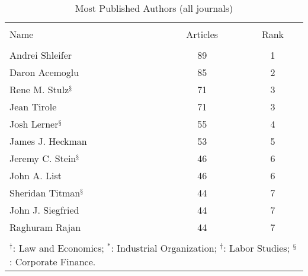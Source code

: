 
\begin{table}[!htbp] \centering 
  \caption{Most Published Authors (all journals)} 
  \label{} 
\begin{adjustbox}{max width = \textwidth}
\begin{tabular}{@{\extracolsep{5pt}} lcc} 
\\[-1.8ex]\hline 
\hline \\[-1.8ex] 
Name & Articles & Rank \\ 
\hline \\[-1.8ex] 
Andrei Shleifer & 89 & 1 \\ 
Daron Acemoglu & 85 & 2 \\ 
Rene M. Stulz$^{\mathsection}$ & 71 & 3 \\ 
Jean Tirole & 71 & 3 \\ 
Josh Lerner$^{\mathsection}$ & 55 & 4 \\ 
James J. Heckman & 53 & 5 \\ 
Jeremy C. Stein$^{\mathsection}$ & 46 & 6 \\ 
John A. List & 46 & 6 \\ 
Sheridan Titman$^{\mathsection}$ & 44 & 7 \\ 
John J. Siegfried & 44 & 7 \\ 
Raghuram Rajan & 44 & 7 \\ 
\hline \\[-1.8ex] 
\multicolumn{3}{l}{\footnotesize{$^{\dag}$: Law and Economics; $^{*}$: Industrial Organization; $^{\dag}$: Labor Studies; $^{\mathsection}$: Corporate Finance. }}\\ 
\end{tabular} 
\end{adjustbox} 
\end{table} 
